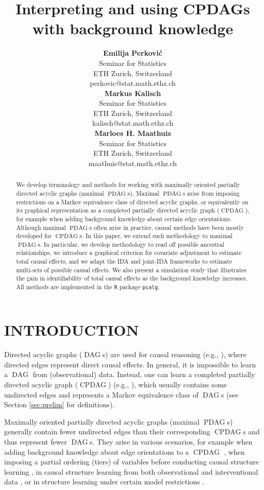 \documentclass[letterpaper]{article}
\title{Interpreting and using CPDAGs with background knowledge}
\author{ {\bf Emilija Perkovi\'c} \\
Seminar for Statistics \\
ETH Zurich, Switzerland\\
perkovic@stat.math.ethz.ch \\
\And
{\bf Markus Kalisch}\\
Seminar for Statistics \\
ETH Zurich, Switzerland\\
kalisch@stat.math.ethz.ch\\
\And
{\bf Marloes H. Maathuis}\\
Seminar for Statistics \\
ETH Zurich, Switzerland\\
maathuis@stat.math.ethz.ch\\
}
\theoremstyle{definition}
\theoremstyle{remark}
\DeclareMathOperator{\PDAG}{PDAG}
\DeclareMathOperator{\CPDAG}{CPDAG}
\DeclareMathOperator{\DAG}{DAG}
\newcommand{\mpdag}{maximal $\PDAG$}
\newcommand{\Mpdag}{Maximal $\PDAG$}
\begin{document}
\maketitle

\begin{abstract}
We develop terminology and methods for working with
maximally oriented partially directed acyclic graphs (\mpdag{}s).
\Mpdag{}s arise from imposing restrictions on a Markov equivalence class of directed acyclic graphs, or equivalently on its graphical representation as a completed partially directed acyclic graph ($\CPDAG$), for example when adding background knowledge about certain edge orientations. Although \mpdag{}s often arise in practice, causal methods have been mostly developed for $\CPDAG$s. In this paper, we extend such methodology to \mpdag{}s. In particular, we develop methodology to read off possible ancestral relationships, we introduce a graphical criterion for covariate adjustment to estimate total causal effects, and we adapt the IDA and joint-IDA frameworks to estimate multi-sets of possible causal effects. We also present a simulation study that illustrates the gain in identifiability of total causal effects as the background knowledge increases. All methods are implemented in the \texttt{R} package \texttt{pcalg}.
\end{abstract}

\section{INTRODUCTION}  \label{sec:intro}

Directed acyclic graphs ($\DAG$s) are used for causal reasoning (e.g., \citealp{Pearl2009}), where directed edges represent direct causal effects. In general, it is impossible to learn a $\DAG$ from (observational) data. Instead, one can learn a completed partially directed acyclic graph ($\CPDAG$) (e.g., \citealp{spirtes2000causation, Chickering02-optimal}), which usually contains some undirected edges and represents a Markov equivalence class of $\DAG$s (see Section \ref{sec:prelim} for definitions). 

Maximally oriented partially directed acyclic graphs (\mpdag{}s) generally contain fewer undirected edges than their corresponding $\CPDAG$s and thus represent fewer $\DAG$s. They arise in various scenarios, for example when adding background knowledge about edge orientations to a $\CPDAG$ \citep{meek1995causal}, when imposing a partial ordering (tiers) of variables before conducting causal structure learning \citep{tetrad1998}, in causal structure  learning from both observational and interventional data \citep{hauserBuehlmann12,wang2017permutation}, or in structure learning under certain model restrictions \citep{hoyer08,ernestroth2016,eigenmann17}.
\end{document}
